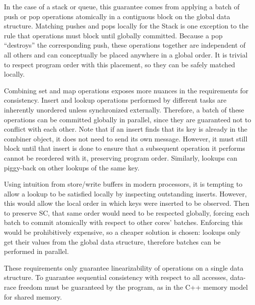 In the case of a stack or queue, this guarantee comes from applying a batch of push or pop operations atomically in a contiguous block on the global data structure.
Matching pushes and pops locally for the Stack is one exception to the rule that operations must block until globally committed. Because a pop ``destroys'' the corresponding push, these operations together are independent of all others and can conceptually be placed anywhere in a global order. It is trivial to respect program order with this placement, so they can be safely matched locally.

Combining set and map operations exposes more nuances in the requirements for consistency.
Insert and lookup operations performed by different tasks are inherently unordered unless synchronized externally.
Therefore, a batch of these operations can be committed globally in parallel, since they are guaranteed not to conflict with each other.
Note that if an insert finds that its key is already in the combiner object, it does not need to send its own message. However, it must still block until that insert is done to ensure that a subsequent operation it performs cannot be reordered with it, preserving program order.
Similarly, lookups can piggy-back on other lookups of the same key.

Using intuition from store/write buffers in modern processors, it is tempting to allow a lookup to be satisfied locally by inspecting outstanding inserts.
However, this would allow the local order in which keys were inserted to be observed.
Then to preserve SC, that same order would need to be respected globally, forcing each batch to commit atomically with respect to other cores' batches. Enforcing this would be prohibitively expensive, so a cheaper solution is chosen: lookups only get their values from the global data structure, therefore batches can be performed in parallel.

These requirements only guarantee linearizability of operations on a single data structure. To guarantee sequential consistency with respect to all accesses, data-race freedom must be guaranteed by the program, as in the C++ memory model for shared memory.

